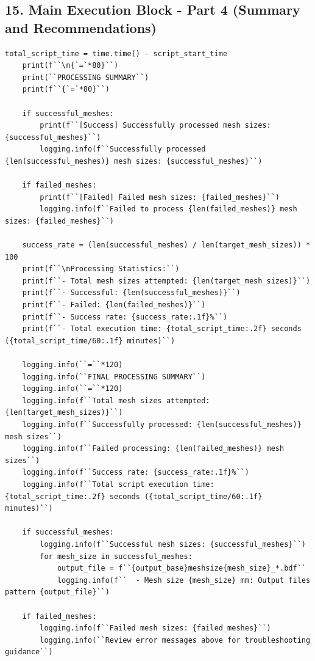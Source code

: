 \documentclass{book}
\begin{document}
\begin{itemize}[leftmargin=*,label=\textbullet]
\subsection*{15. Main Execution Block - Part 4 (Summary and Recommendations)}
\begin{lstlisting}[caption={Main Execution Block - Summary and Recommendations},label={lst:main_4}]
    total_script_time = time.time() - script_start_time
    print(f``\n{`=`*80}``)
    print(``PROCESSING SUMMARY``)
    print(f``{`=`*80}``)

    if successful_meshes:
        print(f``[Success] Successfully processed mesh sizes: {successful_meshes}``)
        logging.info(f``Successfully processed {len(successful_meshes)} mesh sizes: {successful_meshes}``)

    if failed_meshes:
        print(f``[Failed] Failed mesh sizes: {failed_meshes}``)
        logging.info(f``Failed to process {len(failed_meshes)} mesh sizes: {failed_meshes}``)

    success_rate = (len(successful_meshes) / len(target_mesh_sizes)) * 100
    print(f``\nProcessing Statistics:``)
    print(f``- Total mesh sizes attempted: {len(target_mesh_sizes)}``)
    print(f``- Successful: {len(successful_meshes)}``)
    print(f``- Failed: {len(failed_meshes)}``)
    print(f``- Success rate: {success_rate:.1f}%``)
    print(f``- Total execution time: {total_script_time:.2f} seconds ({total_script_time/60:.1f} minutes)``)

    logging.info(``=``*120)
    logging.info(``FINAL PROCESSING SUMMARY``)
    logging.info(``=``*120)
    logging.info(f``Total mesh sizes attempted: {len(target_mesh_sizes)}``)
    logging.info(f``Successfully processed: {len(successful_meshes)} mesh sizes``)
    logging.info(f``Failed processing: {len(failed_meshes)} mesh sizes``)
    logging.info(f``Success rate: {success_rate:.1f}%``)
    logging.info(f``Total script execution time: {total_script_time:.2f} seconds ({total_script_time/60:.1f} minutes)``)

    if successful_meshes:
        logging.info(f``Successful mesh sizes: {successful_meshes}``)
        for mesh_size in successful_meshes:
            output_file = f``{output_base}meshsize{mesh_size}_*.bdf``
            logging.info(f``  - Mesh size {mesh_size} mm: Output files pattern {output_file}``)

    if failed_meshes:
        logging.info(f``Failed mesh sizes: {failed_meshes}``)
        logging.info(``Review error messages above for troubleshooting guidance``)


\end{lstlisting}
\end{itemize}
\end{document}

